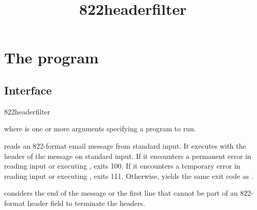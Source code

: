 \documentclass{book}
\title{822headerfilter}
\begin{document}
\section{The  program}

\subsection{Interface}
\begin{code}%
  822headerfilter 
\end{code}
where  is one or more arguments specifying a program to
run.

 reads an 822-format email message from standard
input.  It executes  with the header of the message on
standard input.  If it encounters a permanent error in reading input
or executing ,  exits 100.  If it
encounters a temporary error in reading input or executing
,  exits 111.  Otherwise,
 yields the same exit code as .

 considers the end of the message or the first
line that cannot be part of an 822-format header field to terminate
the headers.
\end{document}
